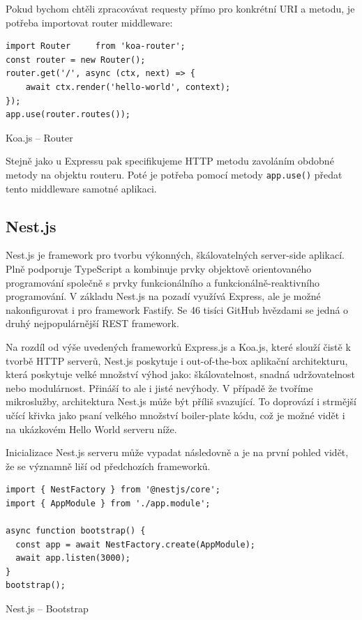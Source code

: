 \documentclass[thesis=M,czech]{FITthesis}[2019/12/23]
\begin{document}
Pokud bychom chtěli zpracovávat requesty přímo pro konkrétní URI a metodu, je potřeba importovat router middleware:

\begin{listing}[H]
\begin{verbatim}
import Router     from 'koa-router';
const router = new Router();
router.get('/', async (ctx, next) => {
    await ctx.render('hello-world', context);
});
app.use(router.routes());
\end{verbatim}
\caption{Koa.js -- Router}
\label{lst:koa_router}
\end{listing}

Stejně jako u Expressu pak specifikujeme HTTP metodu zavoláním obdobné metody na objektu routeru. Poté je potřeba pomocí metody \texttt{app.use()} předat tento middleware samotné aplikaci.

\subsection{Nest.js}
Nest.js \cite{nest} je framework pro tvorbu výkonných, škálovatelných server-side aplikací. Plně podporuje TypeScript a kombinuje prvky objektově orientovaného programování společně s prvky funkcionálního a funkcionálně-reaktivního programování. V základu Nest.js na pozadí využívá Express, ale je možné nakonfigurovat i pro framework Fastify. Se 46 tisíci GitHub hvězdami se jedná o druhý nejpopulárnější REST framework.

Na rozdíl od  výše uvedených frameworků Express.js a Koa.js, které slouží čistě k tvorbě HTTP serverů, Nest.js poskytuje i out-of-the-box aplikační architekturu, která poskytuje velké množství výhod jako: škálovatelnost, snadná udržovatelnost nebo modulárnost. Přináší to ale i jisté nevýhody. V případě že tvoříme mikroslužby, architektura Nest.js může být příliš svazující. To doprovází i strmější učící křivka jako psaní velkého množství boiler-plate kódu, což je možné vidět i na ukázkovém Hello World serveru níže. 

Inicializace Nest.js serveru může vypadat následovně a je na první pohled vidět, že se významně liší od předchozích frameworků.

\begin{listing}[H]
\begin{verbatim}
import { NestFactory } from '@nestjs/core';
import { AppModule } from './app.module';

async function bootstrap() {
  const app = await NestFactory.create(AppModule);
  await app.listen(3000);
}
bootstrap();
\end{verbatim}
\caption{Nest.js -- Bootstrap}
\label{lst:nest_bootstrap}
\end{listing}
\end{document}

